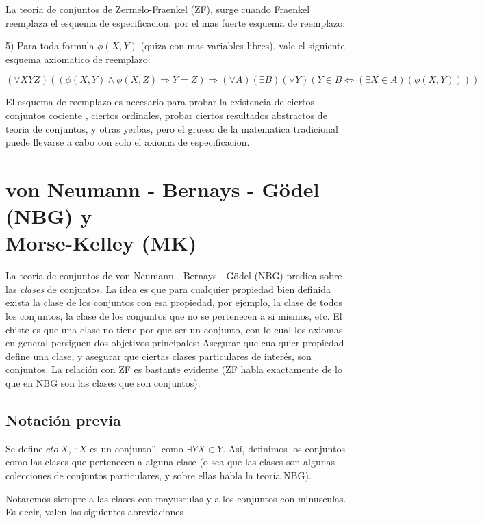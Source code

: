 \documentclass[12pt]{article}
\begin{document}
La teoría de conjuntos de Zermelo-Fraenkel (ZF), surge cuando Fraenkel reemplaza el esquema de especificacion, por el mas fuerte esquema de
reemplazo:

5) Para toda formula $\phi(X,Y)$ (quiza con mas variables libres), vale el siguiente esquema axiomatico de reemplazo:

$$(\forall XYZ) ((\phi(X,Y) \wedge \phi(X,Z) \Rightarrow Y = Z) \Rightarrow (\forall A) (\exists B) (\forall Y) (Y \in B \Leftrightarrow (\exists X \in A) (\phi(X,Y))) )$$

El esquema de reemplazo es necesario para probar la existencia de ciertos conjuntos cociente , ciertos ordinales, probar ciertos resultados
abstractos de teoria de conjuntos, y otras yerbas, pero el grueso de la matematica tradicional puede llevarse a cabo con solo el axioma
de especificacion.

\section{von Neumann - Bernays - Gödel (NBG) y \\ Morse-Kelley (MK)}

La teoría de conjuntos de von Neumann - Bernays - Gödel (NBG) predica sobre las \textit{clases} de conjuntos.
La idea es que para cualquier propiedad bien definida exista la clase de los conjuntos con esa propiedad, por ejemplo,
la clase de todos los conjuntos, la clase de los conjuntos que no se pertenecen a si mismos, etc. El chiste es que una
clase no tiene por que ser un conjunto, con lo cual los axiomas en general persiguen dos objetivos principales: Asegurar
que cualquier propiedad define una clase, y asegurar que ciertas clases particulares de interés, son conjuntos. La
relación con ZF es bastante evidente (ZF habla exactamente de lo que en NBG son las clases que son conjuntos).

\subsection{Notación previa}

Se define $cto \ X$, ``$X$ es un conjunto'', como $\exists Y X \in Y$. Así, definimos los conjuntos como las clases que
pertenecen a alguna clase (o sea que las clases son algunas colecciones de conjuntos particulares, y sobre ellas habla
la teoría NBG).

Notaremos siempre a las clases con mayusculas y a los conjuntos con minusculas. Es decir, valen las siguientes abreviaciones
\end{document}
